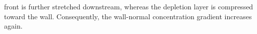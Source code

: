\documentclass[lineno]{JFM-FLM_Au}
\begin{document}
{front is further stretched downstream, whereas the depletion layer is compressed toward the wall. Consequently, the wall-normal concentration gradient increases again.











}
\end{document}
